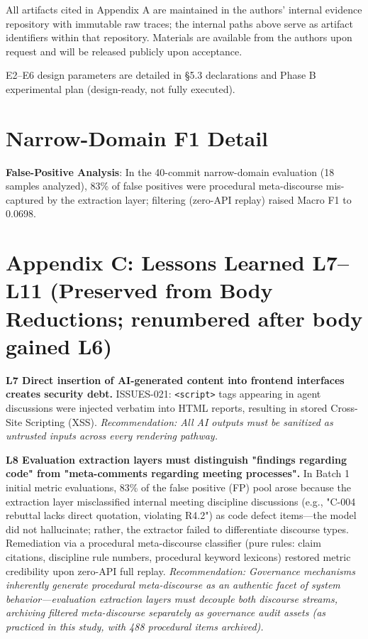 \documentclass[11pt,a4paper]{article}
\begin{document}
All artifacts cited in Appendix A are maintained in the authors' internal evidence repository with immutable raw traces; the internal paths above serve as artifact identifiers within that repository. Materials are available from the authors upon request and will be released publicly upon acceptance.

E2--E6 design parameters are detailed in §5.3 declarations and Phase B experimental plan (design-ready, not fully executed).

\section*{Narrow-Domain F1 Detail}

\textbf{False-Positive Analysis}: In the 40-commit narrow-domain evaluation (18 samples analyzed), 83\% of false positives were procedural meta-discourse mis-captured by the extraction layer; filtering (zero-API replay) raised Macro F1 to 0.0698.

\section*{Appendix C: Lessons Learned L7--L11 (Preserved from Body Reductions; renumbered after body gained L6)}

\textbf{L7 Direct insertion of AI-generated content into frontend interfaces creates security debt.} ISSUES-021: \texttt{\textless{}script\textgreater{}} tags appearing in agent discussions were injected verbatim into HTML reports, resulting in stored Cross-Site Scripting (XSS). \emph{Recommendation: All AI outputs must be sanitized as untrusted inputs across every rendering pathway.}

\textbf{L8 Evaluation extraction layers must distinguish "findings regarding code" from "meta-comments regarding meeting processes".} In Batch 1 initial metric evaluations, 83\% of the false positive (FP) pool arose because the extraction layer misclassified internal meeting discipline discussions (e.g., "C-004 rebuttal lacks direct quotation, violating R4.2") as code defect items---the model did not hallucinate; rather, the extractor failed to differentiate discourse types. Remediation via a procedural meta-discourse classifier (pure rules: claim citations, discipline rule numbers, procedural keyword lexicons) restored metric credibility upon zero-API full replay. \emph{Recommendation: Governance mechanisms inherently generate procedural meta-discourse as an authentic facet of system behavior---evaluation extraction layers must decouple both discourse streams, archiving filtered meta-discourse separately as governance audit assets (as practiced in this study, with 488 procedural items archived).}
\end{document}
